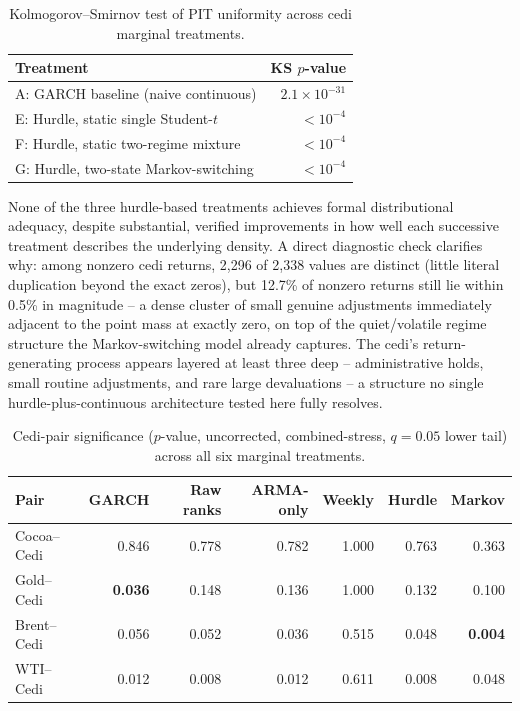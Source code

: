 \documentclass[final,3p,times,authoryear]{elsarticle}
\begin{document}
\begin{table}[htbp]
\centering
\caption{Kolmogorov--Smirnov test of PIT uniformity across cedi marginal treatments.}
\label{tab:cedi-ks}
\begin{tabular}{lr}
\toprule
Treatment & KS $p$-value \\
\midrule
A: GARCH baseline (naive continuous) & $2.1\times 10^{-31}$ \\
E: Hurdle, static single Student-$t$ & $<10^{-4}$ \\
F: Hurdle, static two-regime mixture & $<10^{-4}$ \\
G: Hurdle, two-state Markov-switching & $<10^{-4}$ \\
\bottomrule
\end{tabular}
\end{table}

None of the three hurdle-based treatments achieves formal distributional
adequacy, despite substantial, verified improvements in how well each
successive treatment describes the underlying density. A direct
diagnostic check clarifies why: among nonzero cedi returns, 2,296 of
2,338 values are distinct (little literal duplication beyond the exact
zeros), but 12.7\% of nonzero returns still lie within 0.5\% in
magnitude -- a dense cluster of small genuine adjustments immediately
adjacent to the point mass at exactly zero, on top of the quiet/volatile
regime structure the Markov-switching model already captures. The
cedi's return-generating process appears layered at least three deep --
administrative holds, small routine adjustments, and rare large
devaluations -- a structure no single hurdle-plus-continuous
architecture tested here fully resolves.

\begin{table}[htbp]
\centering
\caption{Cedi-pair significance ($p$-value, uncorrected, combined-stress, $q=0.05$ lower tail) across all six marginal treatments.}
\label{tab:cedi-treatments}
\small
\begin{tabular}{lrrrrrr}
\toprule
Pair & GARCH & Raw ranks & ARMA-only & Weekly & Hurdle & Markov \\
\midrule
Cocoa--Cedi & 0.846 & 0.778 & 0.782 & 1.000 & 0.763 & 0.363 \\
Gold--Cedi  & \textbf{0.036} & 0.148 & 0.136 & 1.000 & 0.132 & 0.100 \\
Brent--Cedi & 0.056 & 0.052 & 0.036 & 0.515 & 0.048 & \textbf{0.004} \\
WTI--Cedi   & 0.012 & 0.008 & 0.012 & 0.611 & 0.008 & 0.048 \\
\bottomrule
\end{tabular}
\end{table}
\end{document}

